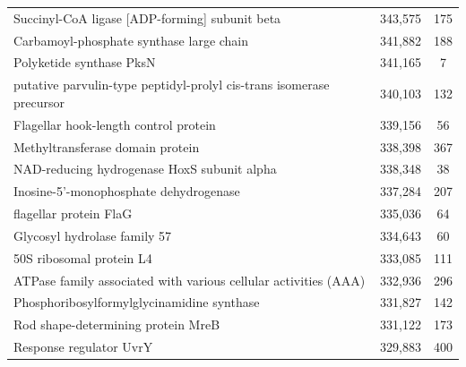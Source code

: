 \begin{singlespace}
\begin{longtable}{p{} cc}
                                            Succinyl-CoA ligase [ADP-forming] subunit beta &                     343,575 &           175 \\
                                                  Carbamoyl-phosphate synthase large chain &                     341,882 &           188 \\
                                                                  Polyketide synthase PksN &                     341,165 &             7 \\
                      putative parvulin-type peptidyl-prolyl cis-trans isomerase precursor &                     340,103 &           132 \\
                                                     Flagellar hook-length control protein &                     339,156 &            56 \\
                                                          Methyltransferase domain protein &                     338,398 &           367 \\
                                               NAD-reducing hydrogenase HoxS subunit alpha &                     338,348 &            38 \\
                                                    Inosine-5'-monophosphate dehydrogenase &                     337,284 &           207 \\
                                                                    flagellar protein FlaG &                     335,036 &            64 \\
                                                              Glycosyl hydrolase family 57 &                     334,643 &            60 \\
                                                                  50S ribosomal protein L4 &                     333,085 &           111 \\
                           ATPase family associated with various cellular activities (AAA) &                     332,936 &           296 \\
                                                Phosphoribosylformylglycinamidine synthase &                     331,827 &           142 \\
                                                        Rod shape-determining protein MreB &                     331,122 &           173 \\
                                                                   Response regulator UvrY &                     329,883 &           400 \\

\end{longtable}
\end{singlespace}
